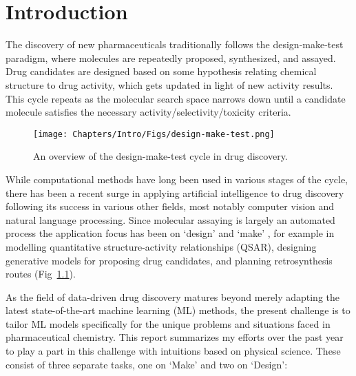 \chapter{Introduction} \label{ch:intro}
The discovery of new pharmaceuticals traditionally follows the design-make-test paradigm, where molecules are repeatedly proposed, synthesized, and assayed. Drug candidates are designed based on some hypothesis relating chemical structure to drug activity, which gets updated in light of new activity results. This cycle repeats as the molecular search space narrows down until a candidate molecule satisfies the necessary activity/selectivity/toxicity criteria.

\begin{figure}[!h] %
\centering
\texttt{[image: Chapters/Intro/Figs/design-make-test.png]}
\caption{\label{fig:cycle} An overview of the design-make-test cycle in drug discovery.}
\end{figure}

While computational methods have long been used in various stages of the cycle, there has been a recent surge in applying artificial intelligence to drug discovery following its success in various other fields, most notably computer vision and natural language processing. Since molecular assaying is largely an automated process the application focus has been on `design' and `make' \cite{Coley2019AutonomousProgress}, for example in modelling quantitative structure-activity relationships (QSAR), designing generative models for proposing drug candidates, and planning retrosynthesis routes (Fig~\ref{fig:cycle}). 

As the field of data-driven drug discovery matures beyond merely adapting the latest state-of-the-art machine learning (ML) methods, the present challenge is to tailor ML models specifically for the unique problems and situations faced in pharmaceutical chemistry. This report summarizes my efforts over the past year to play a part in this challenge with intuitions based on physical science. These consist of three separate tasks, one on `Make' and two on `Design':

